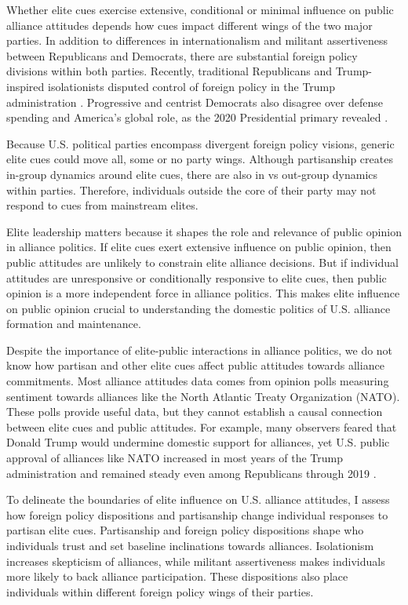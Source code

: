\documentclass[12pt]{article}
\begin{document}
Whether elite cues exercise extensive, conditional or minimal influence on public alliance attitudes depends how cues impact different wings of the two major parties. 
In addition to differences in internationalism and militant assertiveness between Republicans and Democrats, there are substantial foreign policy divisions within both parties.
Recently, traditional Republicans and Trump-inspired isolationists disputed control of foreign policy in the Trump administration \citep{Dueck2019}.
Progressive and centrist Democrats also disagree over defense spending and America's global role, as the 2020 Presidential primary revealed \citep{Robinson2019demfp}.


Because U.S. political parties encompass divergent foreign policy visions, generic elite cues could move all, some or no party wings.
Although partisanship creates in-group dynamics around elite cues, there are also in vs out-group dynamics within parties. 
Therefore, individuals outside the core of their party may not respond to cues from mainstream elites.


Elite leadership matters because it shapes the role and relevance of public opinion in alliance politics.
If elite cues exert extensive influence on public opinion, then public attitudes are unlikely to constrain elite alliance decisions.
But if individual attitudes are unresponsive or conditionally responsive to elite cues, then public opinion is a more independent force in alliance politics. 
This makes elite influence on public opinion crucial to understanding the domestic politics of U.S. alliance formation and maintenance.  


Despite the importance of elite-public interactions in alliance politics, we do not know how partisan and other elite cues affect public attitudes towards alliance commitments. 
Most alliance attitudes data comes from opinion polls measuring sentiment towards alliances like the North Atlantic Treaty Organization (NATO).
These polls provide useful data, but they cannot establish a causal connection between elite cues and public attitudes.
For example, many observers feared that Donald Trump would undermine domestic support for alliances, yet U.S. public approval of alliances like NATO increased in most years of the Trump administration and remained steady even among Republicans through 2019 \citep{PewNATO2020}.


To delineate the boundaries of elite influence on U.S. alliance attitudes, I assess how foreign policy dispositions and partisanship change individual responses to partisan elite cues.
Partisanship and foreign policy dispositions shape who individuals trust and set baseline inclinations towards alliances. 
Isolationism increases skepticism of alliances, while militant assertiveness makes individuals more likely to back alliance participation. 
These dispositions also place individuals within different foreign policy wings of their parties. 
\end{document}
